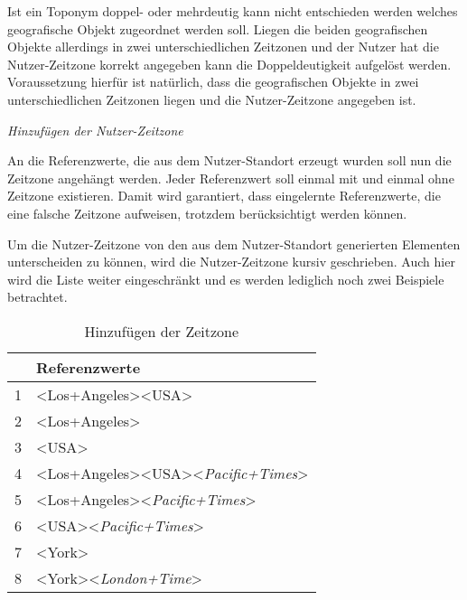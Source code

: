 					Ist ein Toponym doppel- oder mehrdeutig kann nicht entschieden werden welches geografische Objekt zugeordnet werden soll.
					Liegen die beiden geografischen Objekte allerdings in zwei unterschiedlichen Zeitzonen und der Nutzer hat die Nutzer-Zeitzone korrekt angegeben kann die Doppeldeutigkeit aufgelöst werden.
					Voraussetzung hierfür ist natürlich, dass die geografischen Objekte in zwei unterschiedlichen Zeitzonen liegen und die Nutzer-Zeitzone angegeben ist.

				\textit{Hinzufügen der Nutzer-Zeitzone}

					An die Referenzwerte, die aus dem Nutzer-Standort erzeugt wurden soll nun die Zeitzone angehängt werden.
					Jeder Referenzwert soll einmal mit und einmal ohne Zeitzone existieren. 
					Damit wird garantiert, dass eingelernte Referenzwerte, die eine falsche Zeitzone aufweisen, trotzdem berücksichtigt werden können. 

					Um die Nutzer-Zeitzone von den aus dem Nutzer-Standort generierten Elementen unterscheiden zu können, wird die Nutzer-Zeitzone kursiv geschrieben.
					Auch hier wird die Liste weiter eingeschränkt und es werden lediglich noch zwei Beispiele betrachtet.
					
					\begin{table}[h]
					\centering
					\caption{Hinzufügen der Zeitzone}
					\label{tab:ngramsWithTZ}
					\begin{tabular}{|l|l|}
					\hline
					  & \textbf{Referenzwerte}                                                                     \\ \hline
					1 & \textless Los+Angeles\textgreater\textless USA\textgreater                                   \\ \hline
					2 & \textless Los+Angeles\textgreater                                                           \\ \hline
					3 & \textless USA\textgreater                                                                   \\ \hline
					4 & \textless Los+Angeles\textgreater\textless USA\textgreater\textless \textit{Pacific+Times}\textgreater \\ \hline
					5 & \textless Los+Angeles\textgreater\textless \textit{Pacific+Times}\textgreater               \\ \hline
					6 & \textless USA\textgreater\textless \textit{Pacific+Times}\textgreater                       \\ \hline
					7 & \textless York\textgreater                                                                  \\ \hline
					8 & \textless York\textgreater\textless \textit{London+Time}\textgreater                        \\ \hline
					\end{tabular}
					\end{table}

